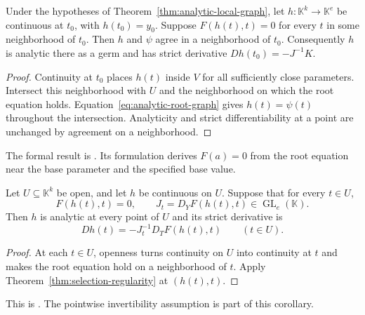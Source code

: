 \begin{theorem}
\label{thm:selection-regularity}
Under the hypotheses of Theorem~\ref{thm:analytic-local-graph}, let
$h:\mathbb K^k\to\mathbb K^e$ be continuous at $t_0$, with
$h(t_0)=y_0$. Suppose $F(h(t),t)=0$ for every $t$ in some neighborhood of
$t_0$. Then $h$ and $\psi$ agree in a neighborhood of $t_0$. Consequently
$h$ is analytic there as a germ and has strict derivative
$Dh(t_0)=-J^{-1}K$.
\end{theorem}
\begin{proof}
Continuity at $t_0$ places $h(t)$ inside $V$ for all sufficiently close
parameters. Intersect this neighborhood with $U$ and the neighborhood on
which the root equation holds. Equation~\eqref{eq:analytic-root-graph} gives
$h(t)=\psi(t)$ throughout the intersection. Analyticity and strict
differentiability at a point are unchanged by agreement on a neighborhood.
\end{proof}
The formal result is
.
Its formulation derives $F(a)=0$ from the root equation near the base
parameter and the specified base value.

\begin{corollary}
\label{cor:selection-open-regularity}
Let $U\subseteq\mathbb K^k$ be open, and let $h$ be continuous on $U$.
Suppose that for every $t\in U$,
\[
 F(h(t),t)=0,
 \qquad J_t=D_YF(h(t),t)\in\operatorname{GL}_e(\mathbb K).
\]
Then $h$ is analytic at every point of $U$ and its strict derivative is
\[
 Dh(t)=-J_t^{-1}D_TF(h(t),t)\qquad(t\in U).
\]
\end{corollary}
\begin{proof}
At each $t\in U$, openness turns continuity on $U$ into continuity at $t$
and makes the root equation hold on a neighborhood of $t$. Apply
Theorem~\ref{thm:selection-regularity} at $(h(t),t)$.
\end{proof}
This is
.
The pointwise invertibility assumption is part of this corollary.

